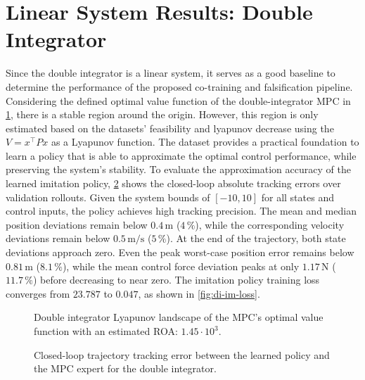 \section{Linear System Results: Double Integrator}
\label{sec:results-linear}

Since the double integrator is a linear system, it serves as a good baseline to determine the performance of 
the proposed co-training and falsification pipeline. Considering the defined optimal value function of the double-integrator MPC in
\cref{fig:di-mpc-lyapunov}, there is a stable region around the origin. However, this region is 
only estimated based on the datasets' feasibility and lyapunov decrease using the $V = x^\top P x$ as a Lyapunov function. The dataset provides a 
practical foundation to learn a policy that is able to approximate the optimal control performance, while preserving the system's stability. 
To evaluate the approximation accuracy of the learned imitation policy, \cref{fig:di-policy-error-bands} shows the closed-loop absolute 
tracking errors over validation rollouts. 
Given the system bounds of $[-10, 10]$ for all states and control inputs, the policy achieves high tracking precision. 
The mean and median position deviations remain below $0.4\,\text{m}$ ($4\,\%$), while the corresponding velocity deviations 
remain below $0.5\,\text{m/s}$ ($5\,\%$). At the end of the trajectory, both state deviations approach zero. 
Even the peak worst-case position error remains below $0.81\,\text{m}$ ($8.1\,\%$), 
while the mean control force deviation peaks at only $1.17\,\text{N}$ ($11.7\,\%$) before decreasing to near zero. 
The imitation policy training loss converges from $23.787$ to $0.047$, as shown in \cref{fig:di-im-loss}. 
\begin{figure}[htbp]
    \centering
    
    \caption{Double integrator Lyapunov landscape of the MPC's optimal value function with an estimated ROA: $1.45\cdot 10^3$.}
    \label{fig:di-mpc-lyapunov}
\end{figure}
\begin{figure}[htbp]
    \centering
    
    \caption{Closed-loop trajectory tracking error between the learned policy and the MPC expert for the double integrator.}
    \label{fig:di-policy-error-bands}
\end{figure}

